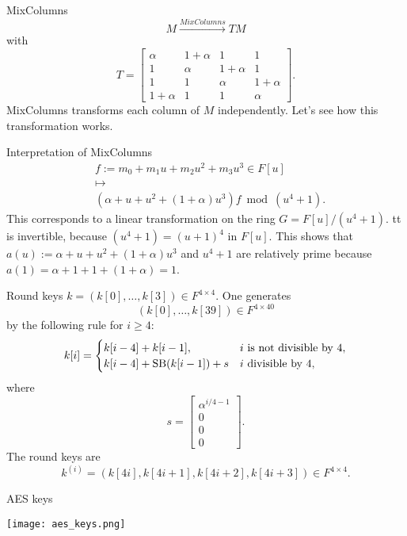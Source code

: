 \documentclass{beamer}
\begin{document}
\begin{frame}{MixColumns} 
	\[
		M \xrightarrow{MixColumns}T M
	\]
	with 
	\[ 
			T = \begin{bmatrix} \alpha & 1 + \alpha & 1 & 1
		\\	1 & \alpha & 1 + \alpha & 1 
		\\ 1 & 1 & \alpha & 1+\alpha
	\\ 1 + \alpha & 1 & 1 & \alpha \end{bmatrix}.
	\]
	MixColumns transforms each column of $M$ independently. Let's see how this transformation works. 
\end{frame} 

\begin{frame}{Interpretation of MixColumns} 
	\begin{align*}
		& f := m_0 + m_1 u + m_2 u^2 + m_3 u^3 \in F[u]
		\\ & \mapsto 
		\\  & (\alpha + u + u^2 + (1+\alpha) u^3) f \bmod (u^4 +1 ). 
	\end{align*} 
	This corresponds to a linear transformation on the ring $G = F[u] / (u^4 + 1)$. tt is invertible, because 
	$(u^4+1) = (u+1)^4$ in $F[u]$. This shows that $a(u) :=\alpha + u + u^2 + (1+\alpha) u^3$ and $u^4+1$ are relatively prime because $a(1) = \alpha + 1 + 1 + (1+\alpha) = 1$. 
\end{frame} 

\begin{frame}{Round keys}  
	$k = (k[0],\ldots,k[3]) \in F^{4 \times 4} $. One generates
	\[
		(k[0],\ldots,k[39]) \in F^{4 \times 40}
	\]
	by the following rule for $i \ge 4$: 
	\[
		k[i] = \begin{cases} 
				k[i-4] + k[i-1], & i \ \text{is not divisible by} \ 4,
				\\ k[i-4] + \SB(k[i-1]) + s & i \ \text{divisible by} \ 4,
			\end{cases} 		
	\]
	where 
	\[
		s = \begin{bmatrix} \alpha^{i/4 - 1} \\ 0 \\ 0 \\ 0\end{bmatrix}. 
	\]
	The round keys are
	\[
		k^{(i)} = ( k[4 i], k[4i +1], k[4i+2], k[4i+3] ) \in F^{4 \times 4}.
	\]
\end{frame} 

\begin{frame}{AES keys} 
\begin{center} 
\texttt{[image: aes\_keys.png]}
\end{center} 
\end{frame} 
\end{document}

